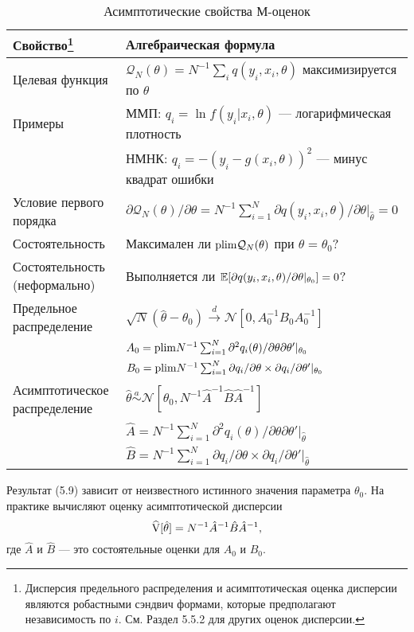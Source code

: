 \begin{table}[h]
\caption{\label{tab:as}Асимптотические свойства М-оценок}
\begin{minipage}{\textwidth}
\begin{tabular}[t]{ll}
\hline
\hline
\bf{Свойство}\footnote{Дисперсия предельного распределения и асимптотическая оценка дисперсии являются робастными сэндвич формами, которые предполагают независимость по $i$. См. Раздел 5.5.2 для других оценок дисперсии.} & \bf{Алгебраическая формула} \\
\hline
Целевая функция &   $\mathcal{Q}_N(\theta)=N^{-1}\sum_i q(y_i,x_i,\theta)$ максимизируется по $\theta$ \\
Примеры &  ММП: $q_i=\ln f(y_i|x_i,\theta)$ --- логарифмическая плотность \\
& НМНК: $q_i= - (y_i-g(x_i,\theta))^2$ --- минус квадрат ошибки \\
Условие первого порядка & 
$ \partial \mathcal{Q}_N(\theta) / \partial \theta =
N^{-1} \sum_{i=1}^{N} \partial q(y_i,x_i,\theta) / \partial \theta |_{\hat{\theta}}=0 $\\
Состоятельность & Максимален ли $\mathrm{plim } \mathcal{Q}_N(\theta)$ при $\theta=\theta_0$? \\
Состоятельность (неформально) & Выполняется ли $\mathbb{E}[\partial q(y_i,x_i,\theta) / \partial \theta |_{\theta_0}]=0$?\\
Предельное распределение & $\sqrt{N}(\hat{\theta} - \theta_0) \xrightarrow{d} \mathcal{N}[0,A_0^{-1}B_0 A_0^{-1}]$ \\
& $A_0=\mathrm{plim } N^{-1} \sum_{i=1}^{N} \partial^2 q_i(\theta) / \partial \theta \partial \theta'|_{\theta_0}$\\
& $B_0=\mathrm{plim } N^{-1} \sum_{i=1}^{N} \partial q_i/ \partial \theta \times \partial q_i/ \partial \theta'|_{\theta_0}$ \\
Асимптотическое распределение &  $\hat{\theta} \stackrel{a}{\sim}\mathcal{N}[\theta_0,N^{-1} \hat{A}^{-1} \hat{B} \hat{A}^{-1}]$\\
& $\hat{A}=N^{-1} \sum_{i=1}^{N} \partial^2 q_i(\theta) / \partial \theta \partial \theta'|_{\hat{\theta}}$\\
& $\hat{B}=N^{-1} \sum_{i=1}^{N} \partial q_i/ \partial \theta \times \partial q_i/ \partial \theta'|_{\hat{\theta}}$ \\
\hline
\hline
\end{tabular}
\end{minipage}
\end{table}

Результат (5.9) зависит от неизвестного истинного значения параметра $\theta_0$. На практике вычисляют оценку асимптотической дисперсии
\begin{equation}
\widehat{\mathrm{V}}[\hat{\theta}]=N^{-1} \hat{A}^{-1} \hat{B} \hat{A}^{-1},
\end{equation}
где $\hat{A}$ и $\hat{B}$ --- это состоятельные оценки для $A_0$ и $B_0$.

